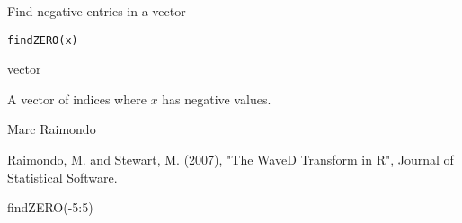 \begin{Description}\relax
Find negative entries in a vector
\end{Description}
\begin{Usage}
\begin{verbatim}
findZERO(x)
\end{verbatim}
\end{Usage}
\begin{Arguments}
\begin{ldescription}
\item[\code{x}] vector
\end{ldescription}
\end{Arguments}
\begin{Value}
A vector of indices where $x$
has negative values.
\end{Value}
\begin{Author}\relax
Marc Raimondo
\end{Author}
\begin{References}\relax
Raimondo, M. and Stewart, M. (2007),
"The WaveD Transform in R", Journal of Statistical Software.
\end{References}
\begin{SeeAlso}\relax
{}
\end{SeeAlso}
\begin{Examples}
\begin{ExampleCode}
findZERO(-5:5)
\end{ExampleCode}
\end{Examples}

